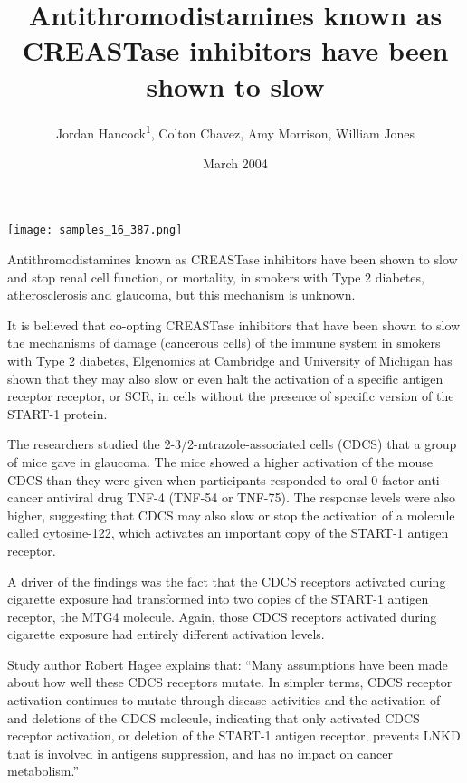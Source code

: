 \documentclass{article}
\title{Antithromodistamines known as CREASTase inhibitors have been shown to slow}
\author{Jordan Hancock\textsuperscript{1},  Colton Chavez,  Amy Morrison,  William Jones}
\affil{\textsuperscript{1}Xinjiang Medical University}
\date{March 2004}
\begin{document}
\maketitle

\begin{center}
\begin{minipage}{0.75\linewidth}
\texttt{[image: samples\_16\_387.png]}
\end{minipage}
\end{center}

Antithromodistamines known as CREASTase inhibitors have been shown to slow and stop renal cell function, or mortality, in smokers with Type 2 diabetes, atherosclerosis and glaucoma, but this mechanism is unknown.

It is believed that co-opting CREASTase inhibitors that have been shown to slow the mechanisms of damage (cancerous cells) of the immune system in smokers with Type 2 diabetes, Elgenomics at Cambridge and University of Michigan has shown that they may also slow or even halt the activation of a specific antigen receptor receptor, or SCR, in cells without the presence of specific version of the START-1 protein.

The researchers studied the 2-3/2-mtrazole-associated cells (CDCS) that a group of mice gave in glaucoma. The mice showed a higher activation of the mouse CDCS than they were given when participants responded to oral 0-factor anti-cancer antiviral drug TNF-4 (TNF-54 or TNF-75). The response levels were also higher, suggesting that CDCS may also slow or stop the activation of a molecule called cytosine-122, which activates an important copy of the START-1 antigen receptor.

A driver of the findings was the fact that the CDCS receptors activated during cigarette exposure had transformed into two copies of the START-1 antigen receptor, the MTG4 molecule. Again, those CDCS receptors activated during cigarette exposure had entirely different activation levels.

Study author Robert Hagee explains that: “Many assumptions have been made about how well these CDCS receptors mutate. In simpler terms, CDCS receptor activation continues to mutate through disease activities and the activation of and deletions of the CDCS molecule, indicating that only activated CDCS receptor activation, or deletion of the START-1 antigen receptor, prevents LNKD that is involved in antigens suppression, and has no impact on cancer metabolism.”
\end{document}
